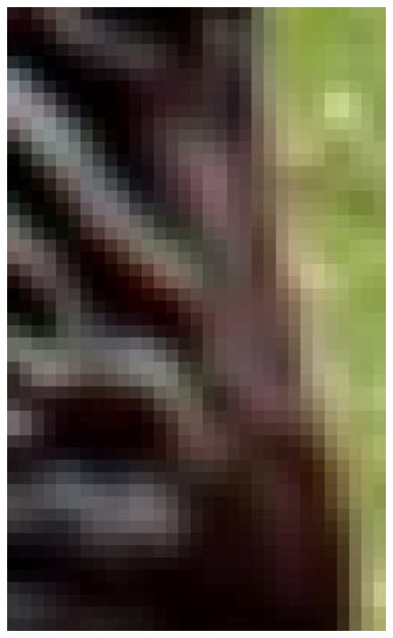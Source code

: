\documentclass[review,numbers,sort&compress]{elsarticle}  %
\begin{document}
\begin{figure}[t]
{\begin{minipage}[b]{0.12\textwidth}
                \includegraphics[width=1\textwidth]{compareImage/Bicubic_zebra_mag_2.png}
            \end{minipage}
        }
\end{figure}
\end{document}
